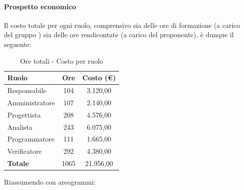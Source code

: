\documentclass[../PianoProgetto.tex]{subfiles}
\begin{document}
\vfill	
	
	\paragraph{Prospetto economico}
					Il costo totale per ogni ruolo, comprensivo sia delle ore di formazione (a carico del gruppo \leaf) sia delle ore rendicontate (a carico del proponente), è dunque il seguente:
	\begin{table}[h]
		\centering
		\begin{tabular}{l * {2}{c}}
			\toprule
			\textbf{Ruolo} & \textbf{Ore} & \textbf{Costo (\euro{})} \\
			\midrule
			Responsabile &	104 & 3.120,00 \\
			Amministratore & 107 & 2.140,00 \\
			Progettista & 208 & 4.576,00 \\
			Analista & 243 & 6.075,00 \\
			Programmatore & 111 & 1.665,00 \\
			Verificatore & 292 & 4.380,00 \\
			\midrule		
			\textbf{Totale} & 1065 &  21.956,00 \\
			\bottomrule
		\end{tabular}
		\caption{Ore totali - Costo per ruolo}
		\label{tab:totale_costo}
	\end{table}
\vfill
\newpage	
\vfill
	Riassumendo con areogrammi:
\end{document}
